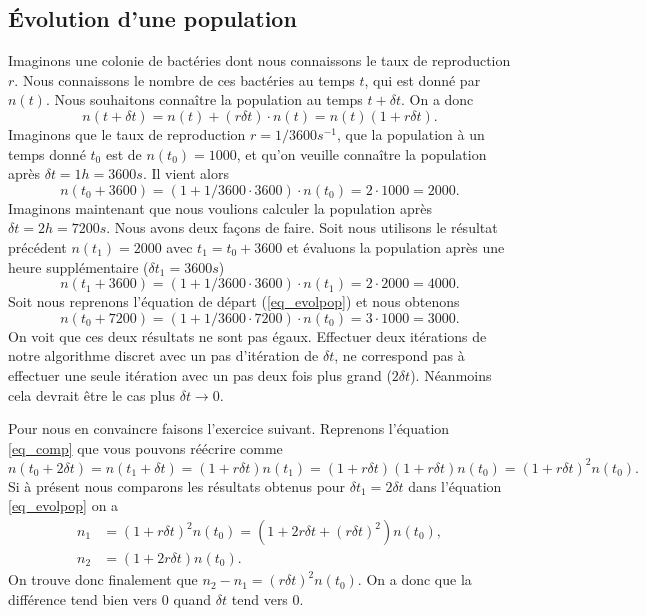 \documentclass[a4paper,12pt]{book}
\renewcommand{\eqref}[1]{\ref{#1}}
\begin{document}
\subsection{Évolution d'une population}

Imaginons une colonie de bactéries dont nous connaissons le taux de reproduction $r$. Nous connaissons le nombre de
ces bactéries au temps $t$, qui est donné par $n(t)$. Nous souhaitons connaître la population au temps $t+\delta t$.
On a donc
\begin{equation}
 n(t+\delta t)=n(t)+(r\delta t)\cdot n(t)=n(t)(1+r\delta t).\label{eq_evolpop}
\end{equation}
Imaginons que le taux de reproduction $r=1/3600 s^{-1}$, que la population à un temps donné $t_0$ est de $n(t_0)=1000$, et qu'on veuille connaître la population après 
$\delta t=1h=3600s$. Il vient alors
\begin{equation}
 n(t_0+3600)=(1+1/3600 \cdot 3600)\cdot n(t_0)=2\cdot1000=2000.
\end{equation}
Imaginons maintenant que nous voulions calculer la population après $\delta t=2h=7200s$. Nous avons deux façons de faire.
Soit nous utilisons le résultat précédent $n(t_1)=2000$ avec $t_1=t_0+3600$ et évaluons la population après une heure supplémentaire ($\delta t_1=3600s$)
\begin{equation}
 n(t_1+3600)=(1+1/3600 \cdot 3600)\cdot n(t_1)=2\cdot 2000=4000.\label{eq_comp}
\end{equation}
Soit nous reprenons l'équation de départ (\eqref{eq_evolpop}) et nous obtenons
\begin{equation}
 n(t_0+7200)=(1+1/3600 \cdot 7200)\cdot n(t_0)=3\cdot 1000=3000.
\end{equation}
On voit que ces deux résultats ne sont pas égaux. Effectuer deux itérations de notre algorithme discret avec un pas d'itération de $\delta t$,
ne correspond pas à effectuer une seule itération avec un pas deux fois plus grand ($2\delta t$). Néanmoins
cela devrait être le cas plus $\delta t\rightarrow 0$.

Pour nous en convaincre faisons l'exercice suivant. 
Reprenons l'équation \eqref{eq_comp} que vous pouvons réécrire comme
\begin{equation}
 n(t_0+2\delta t)=n(t_1+\delta t)=(1+r\delta t) n(t_1)=(1+r  \delta t)(1+r  \delta t) n(t_0)=(1+r\delta t)^2 n(t_0).
\end{equation}
Si à présent nous comparons les résultats obtenus pour $\delta t_1=2\delta t$ dans l'équation \eqref{eq_evolpop} on a
\begin{align}
 n_1&=(1+r\delta t)^2 n(t_0)=(1+2r\delta t+(r\delta t)^2) n(t_0),\\
 n_2&=(1+2r\delta t) n(t_0).
\end{align}
On trouve donc finalement que $n_2-n_1=(r\delta t)^2n(t_0)$. On a donc que la différence tend bien vers 0 quand $\delta t$ tend vers 0.
\end{document}
